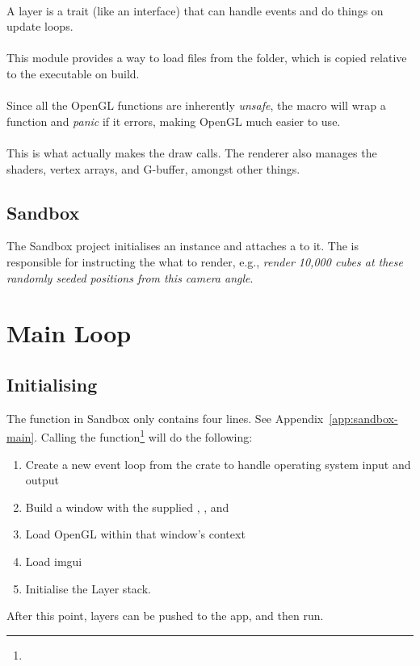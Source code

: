 \paragraph{}
A layer is a trait (like an interface) that can handle events and do things on update loops.

\paragraph{}
This module provides a way to load files from the  folder, which is copied relative to the executable on build.

\paragraph{}
Since all the OpenGL functions are inherently \emph{unsafe}, the  macro will wrap a function and \emph{panic} if it errors, making OpenGL much easier to use.

\paragraph{}
This is what actually makes the draw calls.
The renderer also manages the shaders, vertex arrays, and G-buffer, amongst other things.

\subsection{Sandbox}
The Sandbox project initialises an  instance and attaches a  to it.
The  is responsible for instructing the  what to render, e.g., \emph{render 10,000 cubes at these randomly seeded positions from this camera angle}.

\section{Main Loop}\label{sec:main-loop}

\subsection{Initialising}
The  function in Sandbox only contains four lines. See Appendix~\ref{app:sandbox-main}.
Calling the  function\footnote{} will do the following:
\begin{enumerate}
  \item Create a new event loop from the  crate to handle operating system input and output
  \item Build a window with the supplied , , and 
  \item Load OpenGL within that window's context
  \item Load imgui
  \item Initialise the Layer stack.
\end{enumerate}
After this point, layers can be pushed to the app, and then run.

